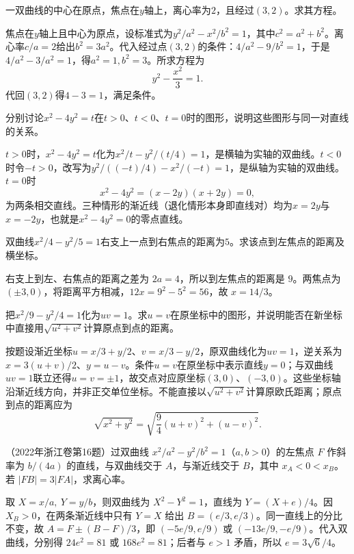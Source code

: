 一双曲线的中心在原点，焦点在\(y\)轴上，离心率为\(2\)，且经过\((3,2)\)。求其方程。
\par
\solutionanswer
焦点在\(y\)轴上且中心为原点，设标准式为\(y^2/a^2-x^2/b^2=1\)，其中\(c^2=a^2+b^2\)。离心率\(c/a=2\)给出\(b^2=3a^2\)。代入经过点\((3,2)\)的条件：\(4/a^2-9/b^2=1\)，于是\(4/a^2-3/a^2=1\)，得\(a^2=1,b^2=3\)。所求方程为
\[
y^2-\frac{x^2}{3}=1.
\]
代回\((3,2)\)得\(4-3=1\)，满足条件。


分别讨论\(x^2-4y^2=t\)在\(t>0\)、\(t<0\)、\(t=0\)时的图形，说明这些图形与同一对直线的关系。
\par
\solutionanswer
\(t>0\)时，\(x^2-4y^2=t\)化为\(x^2/t-y^2/(t/4)=1\)，是横轴为实轴的双曲线。\(t<0\)时令\(-t>0\)，改写为\(y^2/((-t)/4)-x^2/(-t)=1\)，是纵轴为实轴的双曲线。\(t=0\)时
\[
x^2-4y^2=(x-2y)(x+2y)=0,
\]
为两条相交直线。三种情形的渐近线（退化情形本身即直线对）均为\(x=2y\)与\(x=-2y\)，也就是\( x^2-4y^2=0\)的零点直线。


双曲线\(x^2/4-y^2/5=1\)右支上一点到右焦点的距离为\(5\)。求该点到左焦点的距离及横坐标。
\par
\solutionanswer
右支上到左、右焦点的距离之差为 \(2a=4\)，所以到左焦点的距离是 \(9\)。两焦点为 \((\pm3,0)\)，将距离平方相减，\(12x=9^2-5^2=56\)，故 \(x=14/3\)。


把\(x^2/9-y^2/4=1\)化为\(uv=1\)。求\(u=v\)在原坐标中的图形，并说明能否在新坐标中直接用\(\sqrt{u^2+v^2}\)计算原点到点的距离。
\par
\solutionanswer
按题设渐近坐标\(u=x/3+y/2\)、\(v=x/3-y/2\)，原双曲线化为\(uv=1\)，逆关系为\(x=3(u+v)/2\)、\(y=u-v\)。条件\(u=v\)在原坐标中表示直线\(y=0\)；与双曲线\(uv=1\)联立还得\(u=v=\pm1\)，故交点对应原坐标\((3,0)\)、\((-3,0)\)。这些坐标轴沿渐近线方向，并非正交单位坐标。不能直接以\(\sqrt{u^2+v^2}\)计算原欧氏距离；原点到点的距离应为
\[
\sqrt{x^2+y^2}=\sqrt{\frac94(u+v)^2+(u-v)^2}.
\]


（2022年浙江卷第16题）过双曲线 \(x^2/a^2-y^2/b^2=1\)（\(a,b>0\)）的左焦点 \(F\) 作斜率为 \(b/(4a)\) 的直线，与双曲线交于 \(A\)，与渐近线交于 \(B\)，其中 \(x_A<0<x_B\)。若 \(|FB|=3|FA|\)，求离心率。
\par
\solutionanswer
取 \(X=x/a,\ Y=y/b\)，则双曲线为 \(X^2-Y^2=1\)，直线为 \(Y=(X+e)/4\)。因 \(X_B>0\)，在两条渐近线中只有 \(Y=X\) 给出 \(B=(e/3,e/3)\)。同一直线上的分比不变，故 \(A=F\pm(B-F)/3\)，即 \((-5e/9,e/9)\) 或 \((-13e/9,-e/9)\)。代入双曲线，分别得 \(24e^2=81\) 或 \(168e^2=81\)；后者与 \(e>1\) 矛盾，所以 \(e=3\sqrt6/4\)。


